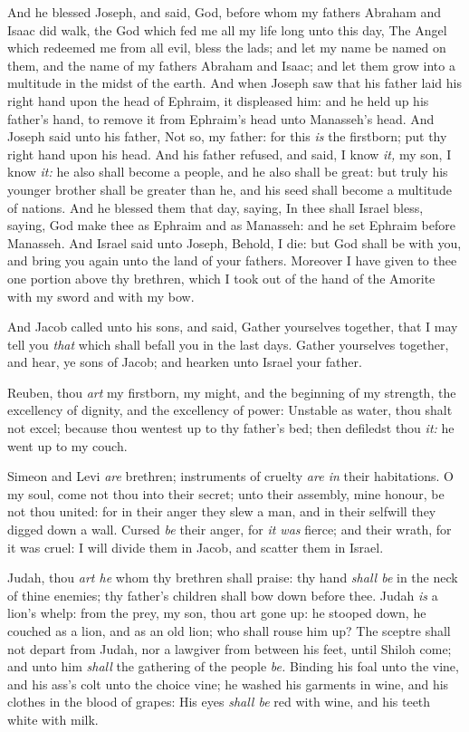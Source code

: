 \documentclass[11pt,letterpaper,oneside]{memoir}
\begin{document}
And he blessed Joseph, and said, God, before whom my fathers Abraham and
Isaac did walk, the God which fed me all my life long unto this day, The
Angel which redeemed me from all evil, bless the lads; and let my name
be named on them, and the name of my fathers Abraham and Isaac; and let
them grow into a multitude in the midst of the earth. And when Joseph
saw that his father laid his right hand upon the head of Ephraim, it
displeased him: and he held up his father's hand, to remove it from
Ephraim's head unto Manasseh's head. And Joseph said unto his father,
Not so, my father: for this \emph{is} the firstborn; put thy right hand
upon his head. And his father refused, and said, I know \emph{it,} my
son, I know \emph{it:} he also shall become a people, and he also shall
be great: but truly his younger brother shall be greater than he, and
his seed shall become a multitude of nations. And he blessed them that
day, saying, In thee shall Israel bless, saying, God make thee as
Ephraim and as Manasseh: and he set Ephraim before Manasseh. And Israel
said unto Joseph, Behold, I die: but God shall be with you, and bring
you again unto the land of your fathers. Moreover I have given to thee
one portion above thy brethren, which I took out of the hand of the
Amorite with my sword and with my bow.

And Jacob called unto his sons, and said, Gather yourselves together,
that I may tell you \emph{that} which shall befall you in the last days.
Gather yourselves together, and hear, ye sons of Jacob; and hearken unto
Israel your father.

Reuben, thou \emph{art} my firstborn, my might, and the beginning of my
strength, the excellency of dignity, and the excellency of power:
Unstable as water, thou shalt not excel; because thou wentest up to thy
father's bed; then defiledst thou \emph{it:} he went up to my couch.

Simeon and Levi \emph{are} brethren; instruments of cruelty \emph{are in}
their habitations. O my soul, come not thou into their secret; unto
their assembly, mine honour, be not thou united: for in their anger they
slew a man, and in their selfwill they digged down a wall. Cursed
\emph{be} their anger, for \emph{it was} fierce; and their wrath, for it
was cruel: I will divide them in Jacob, and scatter them in Israel.

Judah, thou \emph{art he} whom thy brethren shall praise: thy hand
\emph{shall be} in the neck of thine enemies; thy father's children
shall bow down before thee. Judah \emph{is} a lion's whelp: from the
prey, my son, thou art gone up: he stooped down, he couched as a lion,
and as an old lion; who shall rouse him up? The sceptre shall not depart
from Judah, nor a lawgiver from between his feet, until Shiloh come; and
unto him \emph{shall} the gathering of the people \emph{be. } Binding
his foal unto the vine, and his ass's colt unto the choice vine; he
washed his garments in wine, and his clothes in the blood of grapes: His
eyes \emph{shall be} red with wine, and his teeth white with milk.
\end{document}

